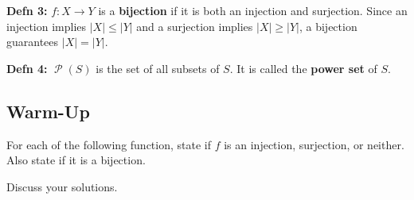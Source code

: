 \documentclass[12pt,letterpaper]{article}
\newcommand\Pow{\ensuremath{\operatorname{\mathcal{P}}}}
\begin{document}
      \textbf{Defn 3:} $f : X \rightarrow Y$ is a \textbf{bijection} if it is both an injection and surjection. Since an injection implies $|X| \leq |Y|$ and a surjection implies $|X| \geq |Y|$, a bijection guarantees $|X| = |Y|$.

      \textbf{Defn 4:} $\Pow(S)$ is the set of all subsets of $S$. It is called the \textbf{power set} of $S$. 

      \subsection*{Warm-Up}
 
      For each of the following function, state if $f$ is an injection, surjection, or neither. Also state if it is a bijection. 

      Discuss your solutions.
\end{document}
